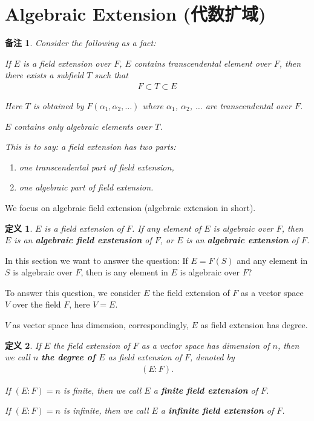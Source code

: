 \documentclass[utf8]{ctexbook}
\newtheorem{definition}{定义}[section]
\newtheorem{memo}{备注}[section]
\begin{document}
\section{Algebraic Extension (代数扩域)}

\begin{memo}
Consider the following as a fact:

If $E$ is a field extension over $F$, $E$ contains transcendental element over $F$, then there exists a subfield $T$ such that
\begin{align*}
F \subset T \subset E
\end{align*}

Here $T$ is obtained by $F(\alpha_1, \alpha_2, \ldots )$ where $\alpha_1$, $\alpha_2$, $\ldots$ are transcendental over $F$. 

$E$ contains only algebraic elements over $T$.

This is to say: a field extension has two parts:
\begin{enumerate}
\item{one transcendental part of field extension,}
\item{one algebraic part of field extension.}
\end{enumerate} 
\end{memo}

We focus on algebraic field extension (algebraic extension in short).

\begin{definition}
$E$ is a field extension of $F$. If any element of $E$ is algebraic over $F$, then $E$ is an \textbf{algebraic field exstension} of $F$, or $E$ is an \textbf{algebraic extension} of $F$.
\end{definition}

In this section we want to answer the question: If $E=F(S)$ and any element in $S$ is algebraic over $F$, then is any element in $E$ is algebraic over $F$?

To answer this question, we consider $E$ the field extension of $F$ as a vector space $V$ over the field $F$, here $V = E$.

$V$ as vector space has dimension, correspondingly, $E$ as field extension has degree.

\begin{definition}
If $E$ the field extension of $F$ as a vector space has dimension of $n$, then we call $n$ \textbf{the degree of $E$} as field extension of $F$, denoted by
\begin{align*}
(E:F).
\end{align*}

If $(E:F) = n$ is finite, then we call $E$ a \textbf{finite field extension} of $F$.

If $(E:F) = n$ is infinite, then we call $E$ a \textbf{infinite field extension} of $F$.

\end{definition}
\end{document}
